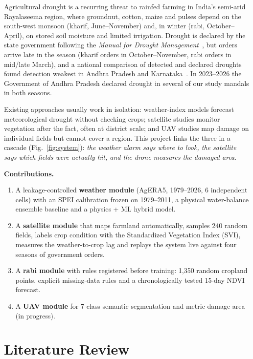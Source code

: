 \documentclass[11pt,a4paper,oneside]{article}
\begin{document}
Agricultural drought is a recurring threat to rainfed farming in India's semi-arid Rayalaseema region, where groundnut, cotton, maize and pulses depend on the south-west monsoon (kharif, June--November) and, in winter (rabi, October--April), on stored soil moisture and limited irrigation. Drought is declared by the state government following the \textit{Manual for Drought Management}~\cite{manual2016}, but orders arrive late in the season (kharif orders in October--November, rabi orders in mid/late March), and a national comparison of detected and declared droughts found detection weakest in Andhra Pradesh and Karnataka~\cite{bhardwaj2021}. In 2023--2026 the Government of Andhra Pradesh declared drought in several of our study mandals in both seasons.

Existing approaches usually work in isolation: weather-index models forecast meteorological drought without checking crops; satellite studies monitor vegetation after the fact, often at district scale; and UAV studies map damage on individual fields but cannot cover a region. This project links the three in a cascade (Fig.~\ref{fig:system}): \emph{the weather alarm says where to look, the satellite says which fields were actually hit, and the drone measures the damaged area}.

\textbf{Contributions.}
\begin{enumerate}
\item A leakage-controlled \textbf{weather module} (AgERA5, 1979--2026, 6 independent cells) with an SPEI calibration frozen on 1979--2011, a physical water-balance ensemble baseline and a physics + ML hybrid model.
\item A \textbf{satellite module} that maps farmland automatically, samples 240 random fields, labels crop condition with the Standardized Vegetation Index (SVI), measures the weather-to-crop lag and replays the system live against four seasons of government orders.
\item A \textbf{rabi module} with rules registered before training: 1,350 random cropland points, explicit missing-data rules and a chronologically tested 15-day NDVI forecast.
\item A \textbf{UAV module} for 7-class semantic segmentation and metric damage area (in progress).
\end{enumerate}

\section{Literature Review}
\end{document}

